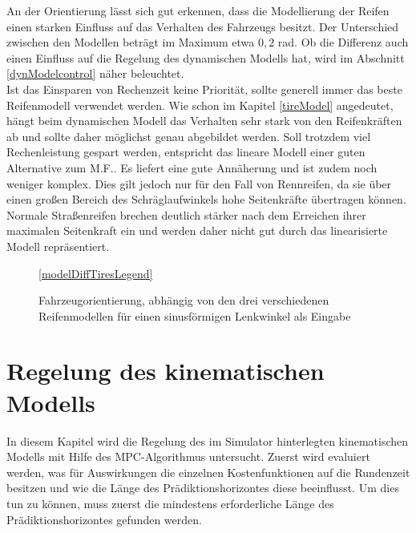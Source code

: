 \documentclass{like}
\begin{document}
An der Orientierung lässt sich gut erkennen, dass die Modellierung der Reifen einen starken Einfluss auf das Verhalten des Fahrzeugs besitzt. Der Unterschied zwischen den Modellen beträgt im Maximum etwa $0,2$ rad. 
Ob die Differenz auch einen Einfluss auf die Regelung des dynamischen Modells hat, wird im Abschnitt \ref{dynModelcontrol} näher beleuchtet. \\
Ist das Einsparen von Rechenzeit keine Priorität, sollte generell immer das beste Reifenmodell verwendet werden. Wie schon im Kapitel \ref{tireModel} angedeutet, hängt beim dynamischen Modell das Verhalten sehr stark von den Reifenkräften ab und sollte daher möglichst genau abgebildet werden. Soll trotzdem viel Rechenleistung gespart werden, entspricht das lineare Modell einer guten Alternative zum \ac{M.F.}. Es liefert eine gute Annäherung und ist zudem noch weniger komplex. Dies gilt jedoch nur für den Fall von Rennreifen, da sie über einen großen Bereich des Schräglaufwinkels hohe Seitenkräfte übertragen können. Normale Straßenreifen brechen deutlich stärker nach dem Erreichen ihrer maximalen Seitenkraft ein und werden daher nicht gut durch das linearisierte Modell repräsentiert. 


\begin{figure}
	\centering
	 
	\ref{modelDiffTiresLegend}
	\caption{Fahrzeugorientierung, abhängig von den drei verschiedenen Reifenmodellen für einen sinusförmigen Lenkwinkel als Eingabe}
	\label{fig:modelDiffTires}
\end{figure}

\newpage
\section{Regelung des kinematischen Modells}
In diesem Kapitel wird die Regelung des im Simulator hinterlegten kinematischen Modells mit Hilfe des \ac{MPC}-Algorithmus untersucht. Zuerst wird evaluiert werden, was für Auswirkungen die einzelnen Kostenfunktionen auf die Rundenzeit besitzen und wie die Länge des Prädiktionshorizontes diese beeinflusst.
Um dies tun zu können, muss zuerst die mindestens erforderliche Länge des Prädiktionshorizontes gefunden werden. 
\end{document}
